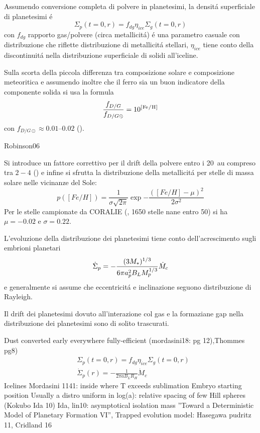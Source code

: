 Assumendo conversione completa di polvere in planetesimi, la densit\'a superficiale di planetesimi \'e
\begin{equation}
\Sigma_p(t=0,r)=f_{dg}\eta_{ice}\Sigma_g(t=0,r)
\end{equation}
con $f_{dg}$ rapporto gas/polvere (circa metallicit\'a) \'e una parametro casuale con distribuzione che riflette distribuzione di metallicit\'a stellari, $\eta_{ice}$ tiene conto della discontinuit\'a nella distribuzione superficiale di solidi all'iceline.

Sulla scorta della piccola differenza tra composizione solare e composizione meteoritica e assumendo inoltre che il ferro sia un buon indicatore della componente solida  si usa la formula
\begin{equation}
\frac{f_{D/G}}{f_{D/G\odot}}=10\expy{[\cel{Fe}{}{}{}/\cel{H}{}{}{}]}
\end{equation}
con $f_{D/G\odot}\approx\numrange{0.01}{0.02}$ (\cite{lodders2003solar}).

\begin{workout}
	Robinson06
\end{workout}

Si introduce un fattore correttivo per il drift della polvere entro i \SI{20}{\astronomicalunit} compreso tra $2-4$ (\cite{kornet2004alternative}) e infine si sfrutta la distribuzione della metallicit\'a per stelle di massa solare nelle vicinanze del Sole:
\begin{equation}
p([Fe/H])=\frac{1}{\sigma\sqrt{2\pi}}\exp{-\frac{([Fe/H]-\mu)^2}{2\sigma^2}}
\end{equation}
Per le stelle campionate da CORALIE (\cite{udry2000coralie}, 1650 stelle nane entro \SI{50}{\parsec}) si ha $\mu=-0.02$ e $\sigma=0.22$.

L'evoluzione della distribuzione dei planetesimi tiene conto dell'acrescimento sugli embrioni planetari
\begin{equation}\dot{\Sigma}_p=-\frac{(3M_*)^{1/3}}{6\pi a_p^2B_LM_p^{1/3}}\dot{M}_c\end{equation}
e generalmente si assume che eccentricit\'a e inclinazione seguono distribuzione di Rayleigh.

Il drift dei planetesimi dovuto all'interazione col gas e la formaziane gap nella distribuzione dei planetesimi sono di solito trascurati.

\begin{workout}
	Dust converted early everywhere fully-efficient (mordasini18: pg 12),Thommes pg8)
	\begin{align*}
	&\Sigma_p(t=0,r)=f_{dg}\eta_{ice}\Sigma_g(t=0,r)\\
	&\dot{\Sigma}_p(r)=-\frac{1}{2\pi aB_LR_H}\dot{M}_c
	\end{align*}
	Icelines Mordasini 1141: inside where T exceeds sublimation
	{Embryo starting position}
	Usually a distro uniform in log(a): relative spacing of few Hill spheres (Kokubo Ida 10)
	Ida, lin10: asymptotical isolation mass ''Toward a Deterministic Model of Planetary Formation VI'',
	Trapped evolution model: Hasegawa pudritz 11, Cridland 16
\end{workout}


